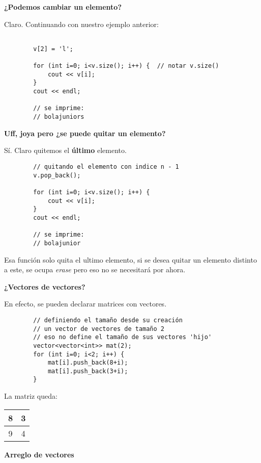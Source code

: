 \documentclass[10pt]{beamer}
\begin{document}
\begin{frame}{}
    \textbf{¿Podemos cambiar un elemento?}
    
    Claro. Continuando con nuestro ejemplo anterior:
    \begin{verbatim}
    
        v[2] = 'l';
        
        for (int i=0; i<v.size(); i++) {  // notar v.size()
            cout << v[i];
        }
        cout << endl;
        
        // se imprime:
        // bolajuniors
    \end{verbatim}

  \framebreak

  \textbf{Uff, joya pero ¿se puede quitar un elemento?}
    
    Sí. Claro quitemos el \textbf{último} elemento.
    \begin{verbatim}
        // quitando el elemento con indice n - 1
        v.pop_back();
        
        for (int i=0; i<v.size(); i++) {
            cout << v[i];
        }
        cout << endl;
        
        // se imprime:
        // bolajunior
    \end{verbatim}
    Esa función solo quita el ultimo elemento, si se desea quitar un elemento distinto a este, se ocupa \textit{erase} pero eso no se necesitará por ahora.
  \framebreak

  \textbf{¿Vectores de vectores?}
  
  En efecto, se pueden declarar matrices con vectores.
      \begin{verbatim}
        // definiendo el tamaño desde su creación
        // un vector de vectores de tamaño 2
        // eso no define el tamaño de sus vectores 'hijo'
        vector<vector<int>> mat(2);
        for (int i=0; i<2; i++) {
            mat[i].push_back(8+i);
            mat[i].push_back(3+i);
        }
    \end{verbatim}
    
    La matriz queda:
    \begin{center}
    \begin{tabular}{ |c|c| }
      \hline
        8 & 3 \\
      \hline
        9 & 4 \\
      \hline
    \end{tabular}
  \end{center}

  \framebreak
    \textbf{Arreglo de vectores}
    

\end{frame}
\end{document}
